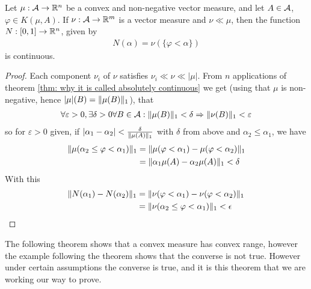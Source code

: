 \begin{lemma}\label{lem: continuous map from measure}
Let $\mu : \mathcal{A} \to \mathbb{R}^{n}$ be a convex and non-negative vector measure, and let $A \in \mathcal{A}$, $\varphi \in K(\mu, A)$. If $\nu: \mathcal{A} \to \mathbb{R}^{m}$ is a vector measure and $\nu \ll \mu$, then the function $N:[0,1] \to \mathbb{R}^{n}$, given by
\begin{align*}
	N(\alpha) = \nu(\{\varphi < \alpha\})
\end{align*}
is continuous.
\end{lemma}
\begin{proof}
Each component $\nu_{i}$ of $\nu$ satisfies $\nu_{i}\ll \nu \ll |\mu|$. From $n$ applications of theorem \cref{thm: why it is called absolutely continuous} we get (using that $\mu$ is non-negative, hence $|\mu|(B)=\Vert{\mu(B)}\Vert_{1}$), that
\begin{align*}
	\forall \varepsilon > 0, \exists \delta > 0 \forall B\in \mathcal{A}: \Vert{\mu(B)}\Vert_{1} < \delta \Rightarrow \Vert{\nu(B)}\Vert_{1} < \varepsilon
\end{align*}
so for $\varepsilon > 0$ given, if $|\alpha_{1}-\alpha_{2}| < \frac{\delta}{\Vert{\mu(A)}\Vert_{1}}$ with $\delta$ from above and $\alpha_{2}\le \alpha_{1}$, we have
\begin{align*}
	\Vert{\mu(\alpha_{2} \le \varphi < \alpha_{1} )}\Vert_{1} &= \Vert{ \mu(\varphi < \alpha_{1}) - \mu(\varphi < \alpha_{2}) }\Vert_{1} \\
	& = \Vert{ \alpha_{1}\mu(A) - \alpha_{2}\mu(A) }\Vert_{1} < \delta
\end{align*}
With this
\begin{align*}
	\Vert{N(\alpha_{1})-N(\alpha_{2})}\Vert_{1} &= \Vert{ \nu(\varphi < \alpha_{1}) - \nu(\varphi< \alpha_{2}) }\Vert_{1} \\
	&= \Vert{ \nu(\alpha_{2} \le \varphi < \alpha_{1}) }\Vert_{1} < \epsilon
\end{align*}
\end{proof}


The following theorem shows that a convex measure has convex range, however the example following the theorem shows that the converse is not true. However under certain assumptions the converse is true, and it is this theorem that we are working our way to prove.

